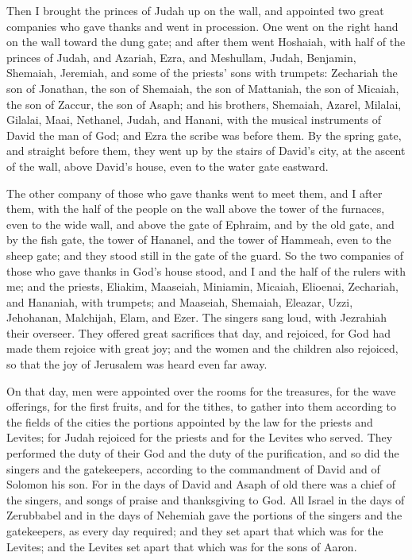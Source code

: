  Then I brought the princes of Judah up on the wall, and
appointed two great companies who gave thanks and went in procession.
One went on the right hand on the wall toward the dung gate;
 and after them went Hoshaiah, with half of the princes of
Judah,  and Azariah, Ezra, and Meshullam, 
Judah, Benjamin, Shemaiah, Jeremiah,  and some of the
priests' sons with trumpets: Zechariah the son of Jonathan, the son of
Shemaiah, the son of Mattaniah, the son of Micaiah, the son of Zaccur,
the son of Asaph;  and his brothers, Shemaiah, Azarel,
Milalai, Gilalai, Maai, Nethanel, Judah, and Hanani, with the musical
instruments of David the man of God; and Ezra the scribe was before
them.  By the spring gate, and straight before them, they
went up by the stairs of David's city, at the ascent of the wall, above
David's house, even to the water gate eastward.

 The other company of those who gave thanks went to meet
them, and I after them, with the half of the people on the wall above
the tower of the furnaces, even to the wide wall,  and
above the gate of Ephraim, and by the old gate, and by the fish gate,
the tower of Hananel, and the tower of Hammeah, even to the sheep gate;
and they stood still in the gate of the guard.  So the two
companies of those who gave thanks in God's house stood, and I and the
half of the rulers with me;  and the priests, Eliakim,
Maaseiah, Miniamin, Micaiah, Elioenai, Zechariah, and Hananiah, with
trumpets;  and Maaseiah, Shemaiah, Eleazar, Uzzi,
Jehohanan, Malchijah, Elam, and Ezer. The singers sang loud, with
Jezrahiah their overseer.  They offered great sacrifices
that day, and rejoiced, for God had made them rejoice with great joy;
and the women and the children also rejoiced, so that the joy of
Jerusalem was heard even far away.

 On that day, men were appointed over the rooms for the
treasures, for the wave offerings, for the first fruits, and for the
tithes, to gather into them according to the fields of the cities the
portions appointed by the law for the priests and Levites; for Judah
rejoiced for the priests and for the Levites who served. 
They performed the duty of their God and the duty of the purification,
and so did the singers and the gatekeepers, according to the commandment
of David and of Solomon his son.  For in the days of David
and Asaph of old there was a chief of the singers, and songs of praise
and thanksgiving to God.  All Israel in the days of
Zerubbabel and in the days of Nehemiah gave the portions of the singers
and the gatekeepers, as every day required; and they set apart that
which was for the Levites; and the Levites set apart that which was for
the sons of Aaron.

